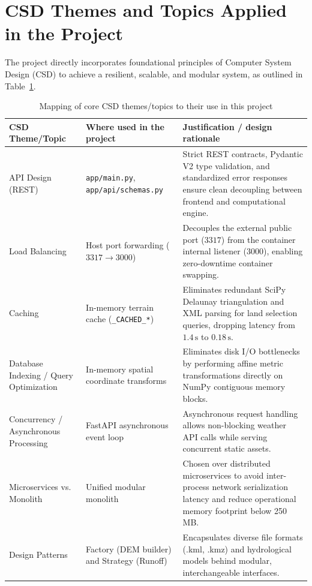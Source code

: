 \documentclass[manuscript,screen,review]{acmart}
\begin{document}
\section{CSD Themes and Topics Applied in the Project}
\label{sec:csd-themes}
The project directly incorporates foundational principles of Computer System Design (CSD) to achieve a resilient, scalable, and modular system, as outlined in Table~\ref{tab:csd-themes}.

\begin{table}[t]
  \caption{Mapping of core CSD themes/topics to their use in this project}
  \label{tab:csd-themes}
  \centering
  \small
  \begin{tabular}{p{3.2cm}p{5.5cm}p{6.8cm}}
    \toprule
    CSD Theme/Topic & Where used in the project & Justification / design rationale \\
    \midrule
    API Design (REST) & \texttt{app/main.py}, \texttt{app/api/schemas.py} & Strict REST contracts, Pydantic V2 type validation, and standardized error responses ensure clean decoupling between frontend and computational engine. \\
    Load Balancing & Host port forwarding ($3317 \to 3000$) & Decouples the external public port ($3317$) from the container internal listener ($3000$), enabling zero-downtime container swapping. \\
    Caching & In-memory terrain cache (\texttt{\_CACHED\_*}) & Eliminates redundant SciPy Delaunay triangulation and XML parsing for land selection queries, dropping latency from $1.4\,\text{s}$ to $0.18\,\text{s}$. \\
    Database Indexing / Query Optimization & In-memory spatial coordinate transforms & Eliminates disk I/O bottlenecks by performing affine metric transformations directly on NumPy contiguous memory blocks. \\
    Concurrency / Asynchronous Processing & FastAPI asynchronous event loop & Asynchronous request handling allows non-blocking weather API calls while serving concurrent static assets. \\
    Microservices vs. Monolith & Unified modular monolith & Chosen over distributed microservices to avoid inter-process network serialization latency and reduce operational memory footprint below 250\,MB. \\
    Design Patterns & Factory (DEM builder) and Strategy (Runoff) & Encapsulates diverse file formats (.kml, .kmz) and hydrological models behind modular, interchangeable interfaces. \\

\end{tabular}
\end{table}
\end{document}
